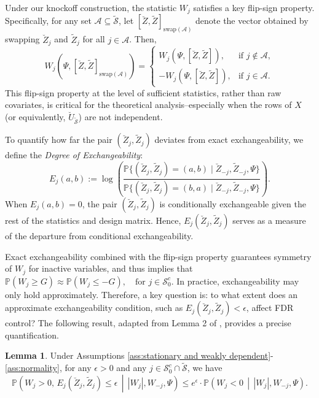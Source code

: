 ﻿\documentclass[12pt]{article}
\newcommand{\0}{\mbox{\bf 0}}
\theoremstyle{plain}%
\newtheorem{lemma}[theorem]{Lemma}
\theoremstyle{definition}
\newtheorem{lemma}[theorem]{Lemma}
\begin{document}
{Under our knockoff construction, the statistic $W_j$ satisfies a key flip-sign property. Specifically, for any set $\mathcal{A} \subseteq \widetilde{\mathcal{S}}$, let $[\breve{Z}, \widetilde{Z}]_{\text{swap}(\mathcal{A})}$ denote the vector obtained by swapping $\breve{Z}_j$ and $\widetilde{Z}_j$ for all $j \in \mathcal{A}$. Then,
\begin{equation}
W_j(\Psi, [\breve{Z}, \widetilde{Z}]_{\text{swap}(\mathcal{A})}) = 
\begin{cases}
W_j(\Psi, [\breve{Z}, \widetilde{Z}]), & \text{if } j \notin \mathcal{A}, \\
- W_j(\Psi, [\breve{Z}, \widetilde{Z}]), & \text{if } j \in \mathcal{A}.
\end{cases}
\end{equation}
This flip-sign property at the level of sufficient statistics, rather than raw covariates, is critical for the theoretical analysis--especially when the rows of $X$ (or equivalently, $\breve{U}_{\widetilde{\mathcal{S}}}$) are not independent.

To quantify how far the pair $(\breve{Z}_j, \widetilde{Z}_j)$ deviates from exact exchangeability, we define the \emph{Degree of Exchangeability}:
\begin{equation}
E_j(a, b) := \log \left( 
\frac{
\mathbb{P} \{ (\breve{Z}_j, \widetilde{Z}_j) = (a, b) \mid \breve{Z}_{-j}, \widetilde{Z}_{-j}, \Psi \}
}{
\mathbb{P} \{ (\breve{Z}_j, \widetilde{Z}_j) = (b, a) \mid \breve{Z}_{-j}, \widetilde{Z}_{-j}, \Psi \}
}
\right).
\label{eq:Ej}
\end{equation}
When $E_j(a, b) = 0$, the pair $(\breve{Z}_j, \widetilde{Z}_j)$ is conditionally exchangeable given the rest of the statistics and design matrix. Hence, $E_j(\breve{Z}_j, \widetilde{Z}_j)$ serves as a measure of the departure from conditional exchangeability.

Exact exchangeability combined with the flip-sign property guarantees symmetry of $W_j$ for inactive variables, and thus implies that
$
    \mathbb{P}(W_j \geq G) \approx \mathbb{P}(W_j \leq -G), \quad \text{for } j \in \mathcal{S}_0^c.
$
In practice, exchangeability may only hold approximately. Therefore, a key question is: to what extent does an approximate exchangeability condition, such as $E_j(\breve{Z}_j, \widetilde{Z}_j) < \epsilon$, affect FDR control? The following result, adapted from Lemma 2 of \citet{BarberCandesSamworth2020}, provides a precise quantification.

\begin{lemma}
\label{lm:degree_exchange}
Under Assumptions \ref{ass:stationary and weakly dependent}-\ref{ass:normality}, for any $\epsilon > 0$ and any $j \in \mathcal{S}_0^c \cap \widetilde{\mathcal{S}}$, we have
\begin{equation*}
\mathbb{P}\left( W_j > 0,\, E_j(\breve{Z}_j, \widetilde{Z}_j) \leq \epsilon \,\middle|\, |W_j|, W_{-j}, \Psi \right) 
\leq e^{\epsilon} \cdot 
\mathbb{P}\left( W_j < 0 \,\middle|\, |W_j|, W_{-j}, \Psi \right).
\end{equation*}
\end{lemma}
  
}
\end{document}
